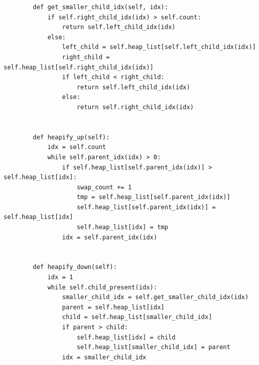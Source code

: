 \documentclass[11pt, a4paper]{article}
\begin{document}
\begin{spacing}{1.1}
\begin{lstlisting}
		def get_smaller_child_idx(self, idx):
			if self.right_child_idx(idx) > self.count:
				return self.left_child_idx(idx)
			else:
				left_child = self.heap_list[self.left_child_idx(idx)]
				right_child = self.heap_list[self.right_child_idx(idx)]
				if left_child < right_child:
					return self.left_child_idx(idx)
				else:
					return self.right_child_idx(idx)
					
		
		def heapify_up(self):
			idx = self.count
			while self.parent_idx(idx) > 0:
				if self.heap_list[self.parent_idx(idx)] > self.heap_list[idx]:
					swap_count += 1
					tmp = self.heap_list[self.parent_idx(idx)]
					self.heap_list[self.parent_idx(idx)] = self.heap_list[idx]
					self.heap_list[idx] = tmp
				idx = self.parent_idx(idx)
		
			
		def heapify_down(self):
			idx = 1
			while self.child_present(idx):
				smaller_child_idx = self.get_smaller_child_idx(idx)
				parent = self.heap_list[idx]
				child = self.heap_list[smaller_child_idx]
				if parent > child:
					self.heap_list[idx] = child
					self.heap_list[smaller_child_idx] = parent
				idx = smaller_child_idx  \end{lstlisting} \vspace*{2mm}

\end{spacing}
\end{document}

